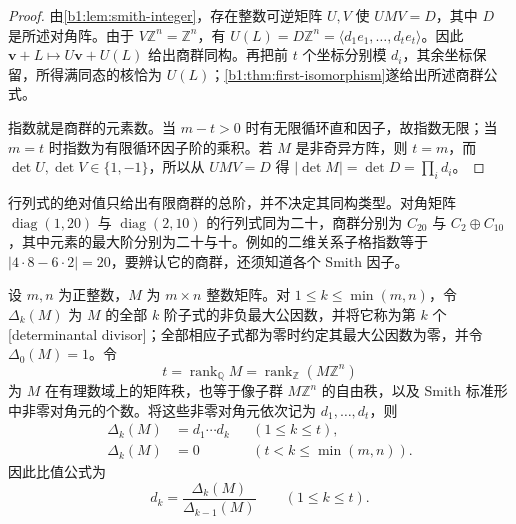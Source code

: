 \begin{proof}
	由\cref{b1:lem:smith-integer}，存在整数可逆矩阵 \(U,V\) 使 \(UMV=D\)，其中 \(D\) 是所述对角阵。由于 \(V\mathbb Z^n=\mathbb Z^n\)，有 \(U(L)=D\mathbb Z^n=\langle d_1e_1,\ldots,d_te_t\rangle\)。因此 \(\mathbf v+L\mapsto U\mathbf v+U(L)\) 给出商群同构。再把前 \(t\) 个坐标分别模 \(d_i\)，其余坐标保留，所得满同态的核恰为 \(U(L)\)；\cref{b1:thm:first-isomorphism}遂给出所述商群公式。

	指数就是商群的元素数。当 \(m-t>0\) 时有无限循环直和因子，故指数无限；当 \(m=t\) 时指数为有限循环因子阶的乘积。若 \(M\) 是非奇异方阵，则 \(t=m\)，而 \(\det U,\det V\in\{1,-1\}\)，所以从 \(UMV=D\) 得 \(|\det M|=\det D=\prod_i d_i\)。
\end{proof}

行列式的绝对值只给出有限商群的总阶，并不决定其同构类型。对角矩阵 \(\operatorname{diag}(1,20)\) 与 \(\operatorname{diag}(2,10)\) 的行列式同为二十，商群分别为 \(C_{20}\) 与 \(C_2\oplus C_{10}\)，其中元素的最大阶分别为二十与十。例如的二维关系子格指数等于 \(|4\cdot8-6\cdot2|=20\)，要辨认它的商群，还须知道各个 Smith 因子。

\begin{proposition}[行列式因子]\label{b1:prop:determinantal-divisors}
	设 \(m,n\) 为正整数，\(M\) 为 \(m\times n\) 整数矩阵。对 \(1\le k\le\min(m,n)\)，令 \(\Delta_k(M)\) 为 \(M\) 的全部 \(k\) 阶子式的非负最大公因数，并将它称为第 \(k\) 个[determinantal divisor]；全部相应子式都为零时约定其最大公因数为零，并令 \(\Delta_0(M)=1\)。令
	\[
		t=\operatorname{rank}_{\mathbb Q}M =\operatorname{rank}_{\mathbb Z}(M\mathbb Z^n)
	\]
	为 \(M\) 在有理数域上的矩阵秩，也等于像子群 \(M\mathbb Z^n\) 的自由秩，以及 Smith 标准形中非零对角元的个数。将这些非零对角元依次记为 \(d_1,\ldots,d_t\)，则
	\[
		\begin{aligned}
			\Delta_k(M)&=d_1\cdots d_k &&(1\le k\le t),\\
			\Delta_k(M)&=0 &&(t<k\le\min(m,n)).
		\end{aligned}
	\]
	因此比值公式为
	\[
		d_k=\frac{\Delta_k(M)}{\Delta_{k-1}(M)}\qquad(1\le k\le t).
	\]
\end{proposition}


